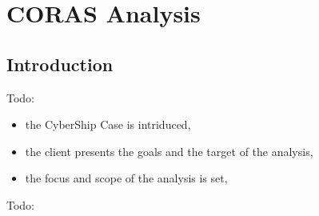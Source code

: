 \chapter{CORAS Analysis}
\section{Introduction}

Todo:
\begin{itemize}
  \item the CyberShip Case is intriduced,
  \item the client presents the goals and the target of the
    analysis,
  \item the focus and scope of the analysis is set,
\end{itemize}Todo:
